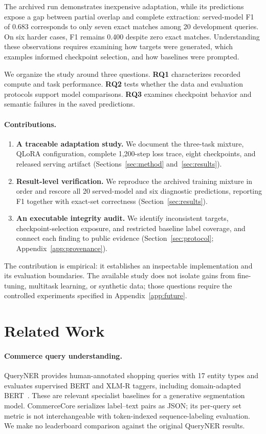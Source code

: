 \documentclass{article}
\begin{document}
The archived run demonstrates inexpensive adaptation, while its predictions expose a gap between partial overlap and complete extraction: served-model F1 of 0.683 corresponds to only seven exact matches among 20 development queries. On six harder cases, F1 remains 0.400 despite zero exact matches. Understanding these observations requires examining how targets were generated, which examples informed checkpoint selection, and how baselines were prompted.

We organize the study around three questions. \textbf{RQ1} characterizes recorded compute and task performance. \textbf{RQ2} tests whether the data and evaluation protocols support model comparisons. \textbf{RQ3} examines checkpoint behavior and semantic failures in the saved predictions.

\paragraph{Contributions.}
\begin{enumerate}
\item \textbf{A traceable adaptation study.} We document the three-task mixture, QLoRA configuration, complete 1,200-step loss trace, eight checkpoints, and released serving artifact (Sections~\ref{sec:method} and~\ref{sec:results}).
\item \textbf{Result-level verification.} We reproduce the archived training mixture in order and rescore all 20 served-model and six diagnostic predictions, reporting F1 together with exact-set correctness (Section~\ref{sec:results}).
\item \textbf{An executable integrity audit.} We identify inconsistent targets, checkpoint-selection exposure, and restricted baseline label coverage, and connect each finding to public evidence (Section~\ref{sec:protocol}; Appendix~\ref{app:provenance}).
\end{enumerate}
The contribution is empirical: it establishes an inspectable implementation and its evaluation boundaries. The available study does not isolate gains from fine-tuning, multitask learning, or synthetic data; those questions require the controlled experiments specified in Appendix~\ref{app:future}.

\section{Related Work}
\paragraph{Commerce query understanding.}
QueryNER provides human-annotated shopping queries with 17 entity types and evaluates supervised BERT and XLM-R taggers, including domain-adapted BERT~\cite{queryner}. These are relevant specialist baselines for a generative segmentation model. CommerceCore serializes label--text pairs as JSON; its per-query set metric is not interchangeable with token-indexed sequence-labeling evaluation. We make no leaderboard comparison against the original QueryNER results.
\end{document}
